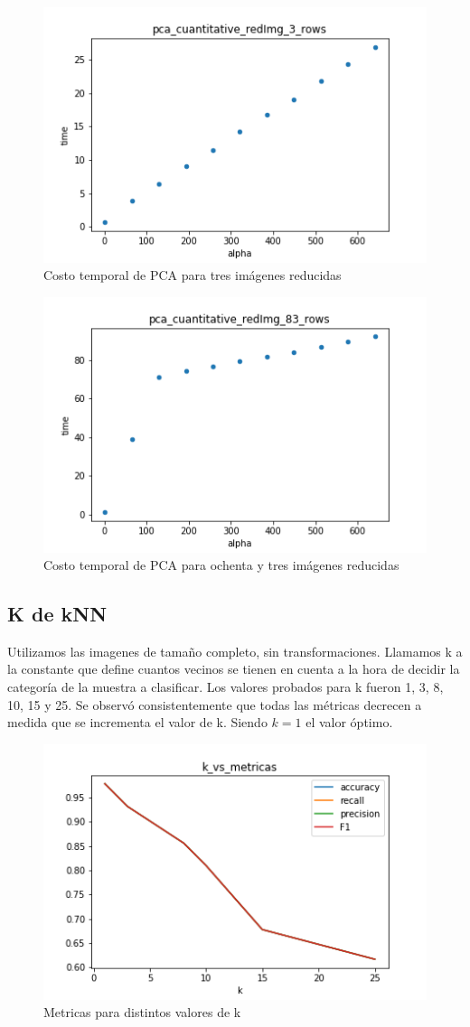\begin{figure}[H]
	\begin{center}
      \includegraphics[width=0.4\columnwidth]{imagenes/charuli-des/pca_cuantitative_redImg_3_rows.png}
      \caption{Costo temporal de PCA para tres imágenes reducidas}
      \end{center}
\end{figure}
\begin{figure}
	\begin{center}
    	\includegraphics[width=0.4\columnwidth]{imagenes/charuli-des/pca_cuantitative_redImg_83_rows.png}
     \caption{Costo temporal de PCA para ochenta y tres imágenes reducidas}
     \end{center}
\end{figure}

\subsection{K de kNN}
 
Utilizamos las imagenes de tamaño completo, sin transformaciones. Llamamos k a la constante que define cuantos vecinos se tienen en cuenta a la hora de decidir la categoría de la muestra a clasificar. Los valores probados para k fueron 1, 3, 8, 10, 15 y 25. Se observó consistentemente que todas las métricas decrecen a medida que se incrementa el valor de k. Siendo $k = 1$ el valor óptimo.
 
\begin{figure}[H]
    \begin{center}
      \includegraphics[width=0.6\columnwidth]{imagenes/charuli-des/k_vs_metricas.png}
      \caption{Metricas para distintos valores de k}
    \end{center}
\end{figure}
 
